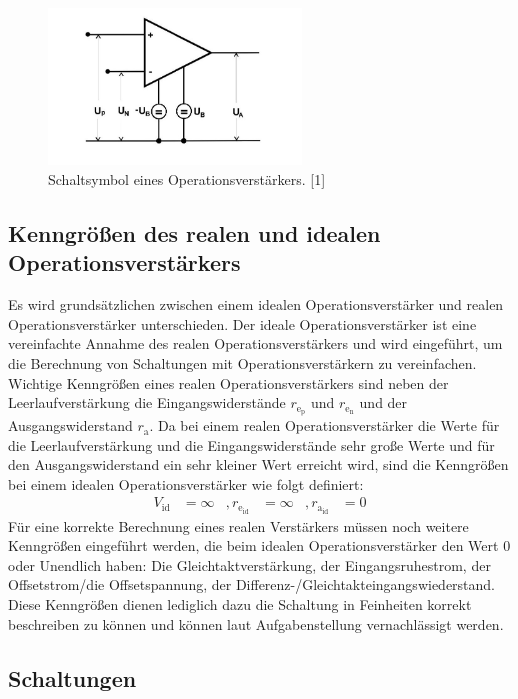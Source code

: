 \documentclass{scrartcl}
\begin{document}
\begin{figure}[!h]
\centering
\includegraphics[width=0.6\textwidth]{schaltsymbol}
\caption{Schaltsymbol eines Operationsverstärkers. [1]}
\label{schalt}
\end{figure}

\subsection{Kenngrößen des realen und idealen Operationsverstärkers}
Es wird grundsätzlichen zwischen einem idealen Operationsverstärker und realen Operationsverstärker unterschieden. Der ideale Operationsverstärker ist eine vereinfachte Annahme des realen Operationsverstärkers und wird eingeführt, um die Berechnung von Schaltungen mit Operationsverstärkern zu vereinfachen. Wichtige Kenngrößen eines realen Operationsverstärkers sind neben der Leerlaufverstärkung die Eingangswiderstände $r_\mathrm{e_\mathrm{p}}$ und $r_\mathrm{e_\mathrm{n}}$ und der Ausgangswiderstand $r_\mathrm{a}$. Da bei einem realen Operationsverstärker die Werte für die Leerlaufverstärkung und die Eingangswiderstände sehr große Werte und für den Ausgangswiderstand ein sehr kleiner Wert erreicht wird, sind die Kenngrößen bei einem idealen Operationsverstärker wie folgt definiert:
\begin{align*}
V_\mathrm{id} &= \infty& ,
r_\mathrm{e_\mathrm{id}} &= \infty& ,
r_\mathrm{a_\mathrm{id}} &= 0
\end{align*}
Für eine korrekte Berechnung eines realen Verstärkers müssen noch weitere Kenngrößen eingeführt werden, die beim idealen Operationsverstärker den Wert 0 oder Unendlich haben: Die Gleichtaktverstärkung, der Eingangsruhestrom, der Offsetstrom/die Offsetspannung, der Differenz-/Gleichtakteingangswiederstand.
Diese Kenngrößen dienen lediglich dazu die Schaltung in Feinheiten korrekt beschreiben zu können und können laut Aufgabenstellung vernachlässigt werden.

\subsection{Schaltungen}
\end{document}
